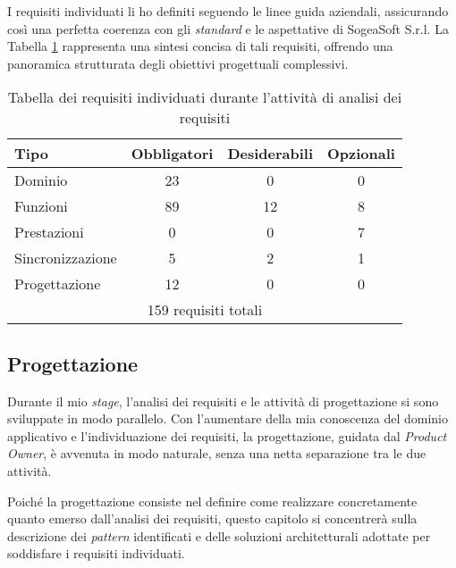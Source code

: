         \vspace{0.2 em}
        \noindent I requisiti individuati li ho definiti seguendo le linee guida aziendali, assicurando così una perfetta coerenza con gli \textit{standard} e le aspettative di SogeaSoft S.r.l. La Tabella \ref{tab:requisiti} rappresenta una sintesi concisa di tali requisiti, offrendo una panoramica strutturata degli obiettivi progettuali complessivi. 

        \begin{table}[H]
        \centering
        \renewcommand{\arraystretch}{1.8} %
        \begin{tabular}{|l|c|c|c|}
        \hline
        \rowcolor[gray]{0.95}
        \textbf{Tipo} & \textbf{Obbligatori} & \textbf{Desiderabili} & \textbf{Opzionali} \\
        \hline
        Dominio & 23 & 0 & 0 \\
        \hline
        Funzioni & 89 & 12 & 8 \\
        \hline
        Prestazioni & 0 & 0 & 7 \\
        \hline
        Sincronizzazione & 5 & 2 & 1 \\
        \hline
        Progettazione & 12 & 0 & 0 \\
        \hline
        \multicolumn{4}{|c|}{159 requisiti totali}\\
        \hline
        \end{tabular}
        \caption[Tabella dei requisiti individuati]{Tabella dei requisiti individuati durante l'attività di analisi dei requisiti}
        \label{tab:requisiti}
        \end{table}

        \subsection{Progettazione}
        Durante il mio \textit{stage}, l'analisi dei requisiti e le attività di progettazione si sono sviluppate in modo parallelo. Con l'aumentare della mia conoscenza del dominio applicativo e l'individuazione dei requisiti, la progettazione, guidata dal \textit{Product Owner}, è avvenuta in modo naturale, senza una netta separazione tra le due attività.  

        \vspace{0.2 em}
        \noindent Poiché la progettazione consiste nel definire come realizzare concretamente quanto emerso dall'analisi dei requisiti, questo capitolo si concentrerà sulla descrizione dei \textit{pattern} identificati e delle soluzioni architetturali adottate per soddisfare i requisiti individuati.

